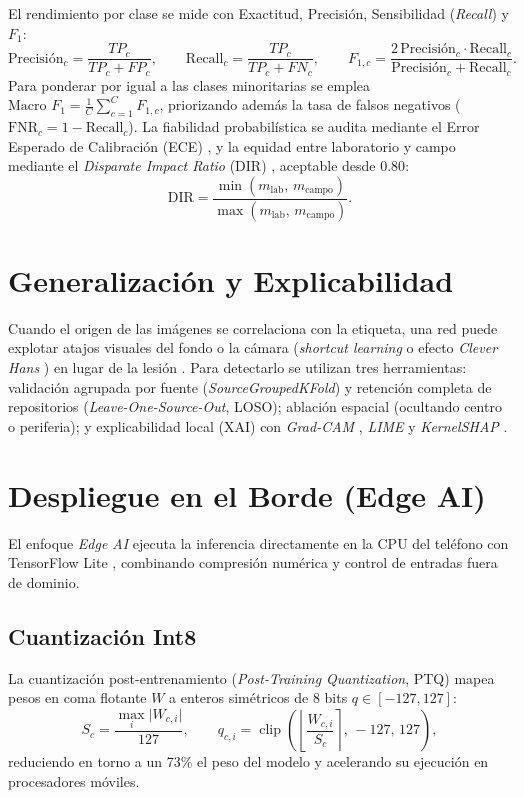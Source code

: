 El rendimiento por clase se mide con Exactitud, Precisi\'on, Sensibilidad (\textit{Recall}) y $F_1$:
\begin{equation}
\text{Precisi\'on}_c = \frac{TP_c}{TP_c + FP_c}, \qquad \text{Recall}_c = \frac{TP_c}{TP_c + FN_c}, \qquad F_{1,c} = \frac{2\,\text{Precisi\'on}_c\cdot \text{Recall}_c}{\text{Precisi\'on}_c + \text{Recall}_c}.
\end{equation}
Para ponderar por igual a las clases minoritarias se emplea $\text{Macro }F_1 = \frac{1}{C}\sum_{c=1}^{C} F_{1,c}$, priorizando adem\'as la tasa de falsos negativos ($\text{FNR}_c = 1-\text{Recall}_c$). La fiabilidad probabil\'istica se audita mediante el Error Esperado de Calibraci\'on (ECE) \cite{guo2017}, y la equidad entre laboratorio y campo mediante el \textit{Disparate Impact Ratio} (DIR) \cite{feldman2015}, aceptable desde $0.80$:
\begin{equation}
\text{DIR} = \frac{\min(m_{\text{lab}},\, m_{\text{campo}})}{\max(m_{\text{lab}},\, m_{\text{campo}})}.
\end{equation}

\section{Generalizaci\'on y Explicabilidad}

Cuando el origen de las im\'agenes se correlaciona con la etiqueta, una red puede explotar atajos visuales del fondo o la c\'amara (\textit{shortcut learning} \cite{geirhos2020} o efecto \textit{Clever Hans} \cite{lapuschkin2019}) en lugar de la lesi\'on \cite{ahmad2023a}. Para detectarlo se utilizan tres herramientas: validaci\'on agrupada por fuente (\textit{SourceGroupedKFold}) y retenci\'on completa de repositorios (\textit{Leave-One-Source-Out}, LOSO); ablaci\'on espacial (ocultando centro o periferia); y explicabilidad local (XAI) \cite{molnar2022} con \textit{Grad-CAM} \cite{selvaraju2017}, \textit{LIME} \cite{ribeiro2016} y \textit{KernelSHAP} \cite{lundberg2017}.

\section{Despliegue en el Borde (Edge AI)}

El enfoque \textit{Edge AI} ejecuta la inferencia directamente en la CPU del tel\'efono con TensorFlow Lite \cite{tflite2024}, combinando compresi\'on num\'erica y control de entradas fuera de dominio.

\subsection{Cuantizaci\'on Int8}
La cuantizaci\'on post-entrenamiento (\textit{Post-Training Quantization}, PTQ) \cite{jacob2018} mapea pesos en coma flotante $W$ a enteros sim\'etricos de 8 bits $q \in [-127, 127]$:
\begin{equation}
S_c = \frac{\max_{i}\lvert W_{c,i}\rvert}{127}, \qquad q_{c,i} = \operatorname{clip}\!\left(\left\lfloor\frac{W_{c,i}}{S_c}\right\rceil,\,-127,\,127\right),
\label{eq:cuant_mt}
\end{equation}
reduciendo en torno a un 73\% el peso del modelo y acelerando su ejecuci\'on en procesadores m\'oviles.

